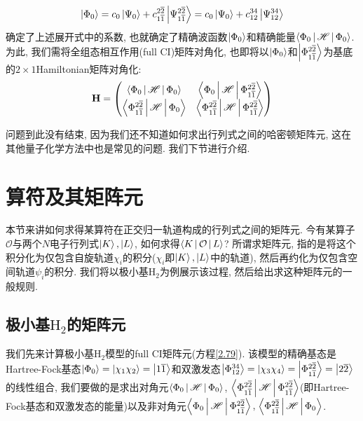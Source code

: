 \begin{equation}
\Ket{\Phi_0}=c_0\Ket{\Psi_0} + c_{1\overline{1}}^{2\overline{2}}\Ket{\Psi_{1\overline{1}}^{2\overline{2}}}=c_0\Ket{\Psi_0} + c_{12}^{34}\Ket{\Psi_{12}^{34}}
\end{equation}
确定了上述展开式中的系数, 也就确定了精确波函数$\Ket{\Phi_0}$和精确能量$\Braket{\Phi_0|\mathscr{H}|\Phi_0}$. 为此, 我们需将全组态相互作用(full CI)矩阵对角化, 也即将以$\Ket{\Phi_0}$和$\Ket{\Phi_{1\overline{1}}^{2\overline{2}}}$为基底的$2\times 1$Hamiltonian矩阵对角化:
\begin{equation}
\label{2.79}
\mathbf{H}=
\begin{pmatrix}
\Braket{{\Phi_0}|\mathscr{H} | {\Phi_0}} & \Braket{{\Phi_0} |\mathscr{H} |{\Phi_{1\overline{1}}^{2\overline{2}}}}\\
\Braket{{\Phi_{1\overline{1}}^{2\overline{2}}}|\mathscr{H} | {\Phi_0}} & \Braket{{\Phi_{1\overline{1}}^{2\overline{2}}} |\mathscr{H} |{\Phi_{1\overline{1}}^{2\overline{2}}}}
	\end{pmatrix}
\end{equation}

问题到此没有结束, 因为我们还不知道如何求出行列式之间的哈密顿矩阵元, 这在其他量子化学方法中也是常见的问题. 我们下节进行介绍.

\section{算符及其矩阵元 }
 \label{sec2.3}
本节来讲如何求得某算符在正交归一轨道构成的行列式之间的矩阵元. 今有某算子$\mathcal{O}$与两个$N$电子行列式$\Ket{K},\Ket{L}$, 如何求得$\Braket{K|\mathcal{O}|L}$? 所谓求矩阵元, 指的是将这个积分化为仅包含自旋轨道$\chi_i$的积分($\chi_i$即$\Ket{K},\Ket{L}$中的轨道), 然后再约化为仅包含空间轨道$\psi_i$的积分.  我们将以极小基$\mathrm{H}_2$为例展示该过程, 然后给出求这种矩阵元的一般规则.

\subsection{极小基$\mathrm{H}_2$的矩阵元}
 \label{sec2.3.1}
我们先来计算极小基$\mathrm{H}_2$模型的full CI矩阵元(方程\ref{2.79}). 该模型的精确基态是Hartree-Fock基态$\Ket{\Phi_0}=\Ket{\chi_1\chi_2}=\Ket{1\overline{1}}$和双激发态$\Ket{\Phi_{12}^{34}}=\Ket{\chi_3\chi_4}=\Ket{\Phi_{1\overline{1}}^{2\overline{2}}}=\Ket{2\overline{2}}$的线性组合, 我们要做的是求出对角元$\Braket{{\Phi_0}|\mathscr{H} | {\Phi_0}}$, $\Braket{{\Phi_{1\overline{1}}^{2\overline{2}}} |\mathscr{H} |{\Phi_{1\overline{1}}^{2\overline{2}}}}$(即Hartree-Fock基态和双激发态的能量)以及非对角元$\Braket{{\Phi_0} |\mathscr{H} |{\Phi_{1\overline{1}}^{2\overline{2}}}},$$\,\Braket{{\Phi_{1\overline{1}}^{2\overline{2}}}|\mathscr{H} | {\Phi_0}}$.

